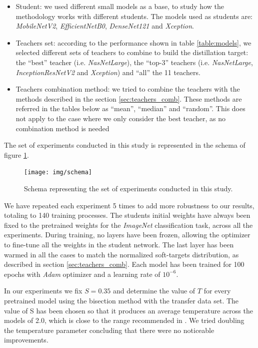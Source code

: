 \documentclass{elsarticle}
\begin{document}
	\begin{itemize}
		\item Student: we used different small models as a base, to study how the methodology works with different students. The models used as students are: \textit{MobileNetV2}, \textit{EfficientNetB0}, \textit{DenseNet121} and \textit{Xception}.
		\item Teachers set: according to the performance shown in table \ref{table:models}, we selected different sets of teachers to combine to build the distillation target: the ``best'' teacher (i.e. \textit{NasNetLarge}), the ``top-3'' teachers (i.e. \textit{NasNetLarge}, \textit{InceptionResNetV2} and \textit{Xception}) and ``all'' the 11 teachers.
		\item Teachers combination method: we tried to combine the teachers with the methods described in the section \ref{sec:teachers_comb}. These methods are referred in the tables below as ``mean'', ``median'' and ``random''. This does not apply to the case where we only consider the best teacher, as no combination method is needed
	\end{itemize}

	The set of experiments conducted in this study is represented in the schema of figure \ref{fig:schema}.
	
\begin{figure}[h!]
	\centering
	\texttt{[image: img/schema]}
	\caption{Schema representing the set of experiments conducted in this study.}
	\label{fig:schema}
\end{figure}

		
	We have repeated each experiment 5 times to add more robustness to our results, totaling to 140 training processes. The students initial weights have always been fixed to the pretrained weights for the \textit{ImageNet} classification task, across all the experiments. During training, no layers have been frozen, allowing the optimizer to fine-tune all the weights in the student network. The last layer has been warmed in all the cases to match the normalized soft-targets distribution, as described in section \ref{sec:teachers_comb}.  Each model has been trained for 100 epochs with \textit{Adam} optimizer \citep{Kingma14} and a learning rate of $10^{-6}$.
	
	 In our experiments we fix $S=0.35$ and determine the value of $T$ for every pretrained model using the bisection method with the transfer data set. The value of S has been chosen so that it produces an average temperature across the models of 2.0, which is close to the range recommended in \citep{hinton2015}. We tried doubling the temperature parameter concluding that there were no noticeable improvements.
	 
\end{document}
